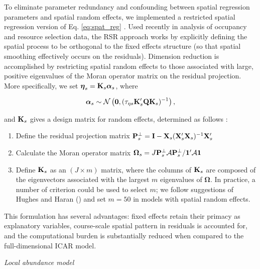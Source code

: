 \documentclass[12pt,fleqn]{article}
\begin{document}
\begin{flushleft}
\hspace{.5in}To eliminate parameter redundancy and confounding between spatial regression parameters and spatial random effects, we implemented a restricted spatial regression \citep[RSR;][]{ReichEtAl2006,HodgesReich2010,HughesHaran2013} version of Eq. \ref{eq:spat_reg} .  Used recently in analysis of occupancy \citep{JohnsonEtAl2013} and resource selection \citep{HootenEtAl2013} data, the RSR approach works by explicitly defining the spatial process to be orthogonal to the fixed effects structure (so that spatial smoothing effectively occurs on the residuals).  Dimension reduction is accomplished by restricting spatial random effects to those associated with large, positive eigenvalues of the Moran operator matrix on the residual projection.  More specifically, we set
$\boldsymbol{\eta}_s = {\bf K}_s\boldsymbol{\alpha}_s$, where
\begin{linenomath*}
\begin{equation*}
 \boldsymbol{\alpha}_s \sim \mathcal{N} \left( {\bf 0},(\tau_{\eta s}{\bf K}_s^\prime{\bf Q} {\bf K}_s)^{-1} \right),
\end{equation*}
\end{linenomath*}
and ${\bf K}_s$ gives a design matrix for random effects, determined
as follows \citep{JohnsonEtAl2013}:
\begin{enumerate}
  \item Define the residual projection matrix ${\bf P}_s^\perp={\bf I}-{\bf X}_s({\bf X}_s^\prime{\bf X}_s)^{-1}{\bf X}_s^\prime$
  \item Calculate the Moran operator matrix $\boldsymbol{\Omega}_s=J{\bf P}_s^\perp \mathcal{A}{\bf P}_s^\perp/{\bf 1}^\prime \mathcal{A} {\bf 1}$
  \item Define ${\bf K}_s$ as an $(J \times m)$ matrix, where the columns of ${\bf K}_s$ are composed of the eigenvectors  associated with the largest $m$ eigenvalues of $\boldsymbol{\Omega}$.  In practice, a number of criterion could be used to select $m$; we follow suggestions of Hughes and Haran (\citeyear{HughesHaran2013}) and set $m=50$ in models with spatial random effects.
\end{enumerate}
This formulation has several advantages: fixed effects retain their primacy as explanatory variables, course-scale spatial pattern in residuals is accounted for, and the computational burden is substantially
reduced when compared to the full-dimensional ICAR model.


\vspace{.15in}
{\it Local abundance model} \\
\vspace{.15in}


\end{flushleft}
\end{document}
